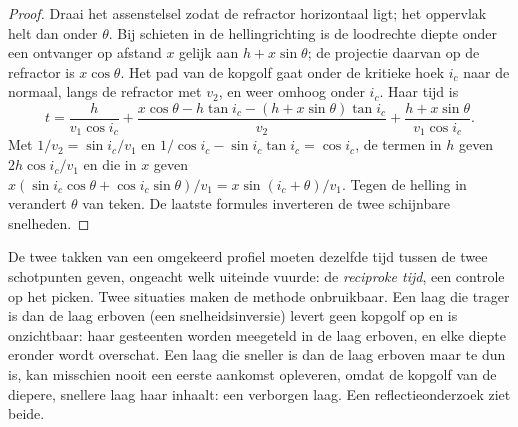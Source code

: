 \begin{proof}
Draai het assenstelsel zodat de refractor horizontaal ligt; het oppervlak helt dan onder
$\theta$. Bij schieten in de hellingrichting is de loodrechte diepte onder een ontvanger op
afstand $x$ gelijk aan $h + x\sin\theta$; de projectie daarvan op de refractor
is $x\cos\theta$. Het pad van de kopgolf gaat onder de kritieke hoek $i_c$ naar de
normaal, langs de refractor met $v_2$, en weer omhoog onder $i_c$. Haar tijd is
\[
  t = \frac{h}{v_1\cos i_c} + \frac{x\cos\theta - h\tan i_c - (h + x\sin\theta)\tan i_c}{v_2}
  + \frac{h + x\sin\theta}{v_1\cos i_c}.
\]
Met $1/v_2 = \sin i_c/v_1$ en $1/\cos i_c - \sin i_c\tan i_c = \cos i_c$,
de termen in $h$ geven $2h\cos i_c/v_1$ en die in $x$
geven $x(\sin i_c\cos\theta + \cos i_c\sin\theta)/v_1 = x\sin(i_c + \theta)/v_1$.
Tegen de helling in verandert $\theta$ van teken. De laatste formules inverteren de twee schijnbare
snelheden.
\end{proof}

De twee takken van een omgekeerd profiel moeten dezelfde tijd tussen de twee
schotpunten geven, ongeacht welk uiteinde vuurde: de \emph{reciproke tijd}, een controle op het
picken. Twee situaties maken de methode onbruikbaar. Een laag die trager is dan de laag erboven
(een snelheidsinversie) levert geen kopgolf op en is onzichtbaar: haar gesteenten worden
meegeteld in de laag erboven, en elke diepte eronder wordt overschat. Een laag
die sneller is dan de laag erboven maar te dun is, kan misschien nooit een eerste aankomst opleveren, omdat
de kopgolf van de diepere, snellere laag haar inhaalt: een verborgen laag. Een
reflectieonderzoek ziet beide.

